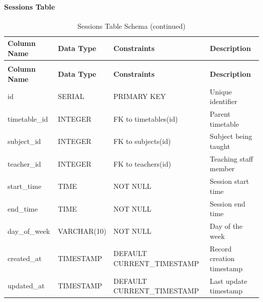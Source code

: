 \documentclass[12pt,a4paper]{report}
\begin{document}
\paragraph{Sessions Table}
\begin{longtable}{|p{3cm}|p{3cm}|p{2cm}|p{6cm}|}
\caption{Sessions Table Schema}
\label{tab:sessions}\\
\hline
\textbf{Column Name} & \textbf{Data Type} & \textbf{Constraints} & \textbf{Description} \\
\hline
\endfirsthead
\caption[]{Sessions Table Schema (continued)}\\
\hline
\textbf{Column Name} & \textbf{Data Type} & \textbf{Constraints} & \textbf{Description} \\
\hline
\endhead
id & SERIAL & PRIMARY KEY & Unique identifier \\
\hline
timetable\_id & INTEGER & FK to timetables(id) & Parent timetable \\
\hline
subject\_id & INTEGER & FK to subjects(id) & Subject being taught \\
\hline
teacher\_id & INTEGER & FK to teachers(id) & Teaching staff member \\
\hline
start\_time & TIME & NOT NULL & Session start time \\
\hline
end\_time & TIME & NOT NULL & Session end time \\
\hline
day\_of\_week & VARCHAR(10) & NOT NULL & Day of the week \\
\hline
created\_at & TIMESTAMP & DEFAULT CURRENT\_TIMESTAMP & Record creation timestamp \\
\hline
updated\_at & TIMESTAMP & DEFAULT CURRENT\_TIMESTAMP & Last update timestamp \\
\hline
\end{longtable}
\end{document}
